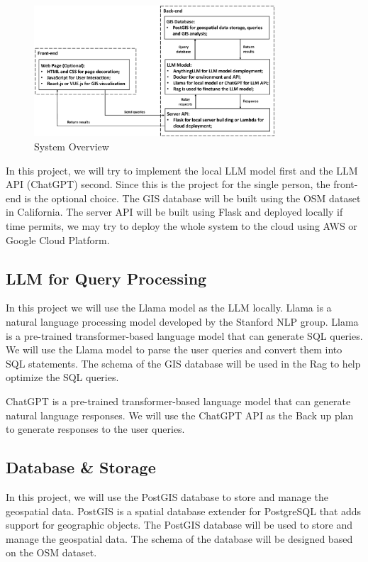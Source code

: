 \documentclass{article}
\begin{document}
\begin{figure}[H]
    \centering
    \includegraphics[width=0.8\textwidth]{figs/Overview.pdf}
    \caption{System Overview}
    \label{fig:system_overview}
\end{figure}

In this project, we will try to implement the local LLM model first and the LLM API (ChatGPT) second. Since this is the project for the single person, the front-end is the optional choice.  The GIS database will be built using the OSM dataset in California. The server API will be built using Flask and deployed locally if time permits, we may try to deploy the whole system to the cloud using AWS or Google Cloud Platform.

\subsection{LLM for Query Processing}
In this project we will use the Llama model \cite{touvron2023llama} as the LLM locally. Llama is a natural language processing model developed by the Stanford NLP group. Llama is a pre-trained transformer-based language model that can generate SQL queries. We will use the Llama model to parse the user queries and convert them into SQL statements. The schema of the GIS database will be used in the Rag to help optimize the SQL queries.

ChatGPT \cite{radford2018improving} is a pre-trained transformer-based language model that can generate natural language responses. We will use the ChatGPT API as the Back up plan to generate responses to the user queries.

\subsection{Database \& Storage}
In this project, we will use the PostGIS database to store and manage the geospatial data. PostGIS is a spatial database extender for PostgreSQL that adds support for geographic objects. The PostGIS database will be used to store and manage the geospatial data. The schema of the database will be designed based on the OSM dataset.
\end{document}

